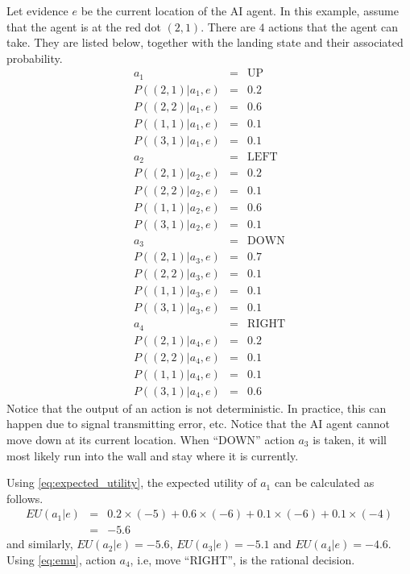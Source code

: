 Let evidence $e$ be the current location of the AI agent. In this example, assume that the agent is at the red dot $(2,1)$. There are $4$ actions that the agent can take. They are listed below, together with the landing state and their associated probability.
\begin{eqnarray}
	a_1 &=& \mathrm{UP} \nonumber \\
	P\left((2,1)|a_1, e\right) &=& 0.2 \nonumber \\
	P\left((2,2)|a_1, e\right) &=& 0.6 \nonumber \\
	P\left((1,1)|a_1, e\right) &=& 0.1 \nonumber \\
	P\left((3,1)|a_1, e\right) &=& 0.1 \nonumber \\
	a_2 &=& \mathrm{LEFT} \nonumber \\
	P\left((2,1)|a_2, e\right) &=& 0.2 \nonumber \\
	P\left((2,2)|a_2, e\right) &=& 0.1 \nonumber \\
	P\left((1,1)|a_2, e\right) &=& 0.6 \nonumber \\
	P\left((3,1)|a_2, e\right) &=& 0.1 \nonumber \\
	a_3 &=& \mathrm{DOWN} \nonumber \\
	P\left((2,1)|a_3, e\right) &=& 0.7 \nonumber \\
	P\left((2,2)|a_3, e\right) &=& 0.1 \nonumber \\
	P\left((1,1)|a_3, e\right) &=& 0.1 \nonumber \\
	P\left((3,1)|a_3, e\right) &=& 0.1 \nonumber \\
	a_4 &=& \mathrm{RIGHT} \nonumber \\
	P\left((2,1)|a_4, e\right) &=& 0.2 \nonumber \\
	P\left((2,2)|a_4, e\right) &=& 0.1 \nonumber \\
	P\left((1,1)|a_4, e\right) &=& 0.1 \nonumber \\
	P\left((3,1)|a_4, e\right) &=& 0.6 \nonumber 
\end{eqnarray}
Notice that the output of an action is not deterministic. In practice, this can happen due to signal transmitting error, etc. Notice that the AI agent cannot move down at its current location. When ``DOWN'' action $a_3$ is taken, it will most likely run into the wall and stay where it is currently.

Using \eqref{eq:expected_utility}, the expected utility of $a_1$ can be calculated as follows.
\begin{eqnarray}
	EU(a_1|e) &=& 0.2\times(-5) + 0.6\times(-6) + 0.1\times(-6) + 0.1\times(-4) \nonumber \\
	&=& -5.6 \nonumber
\end{eqnarray}
and similarly, $EU(a_2|e) = -5.6$, $EU(a_3|e) = -5.1$ and $EU(a_4|e) = -4.6$. Using \eqref{eq:emu}, action $a_4$, i.e, move ``RIGHT'', is the rational decision.

